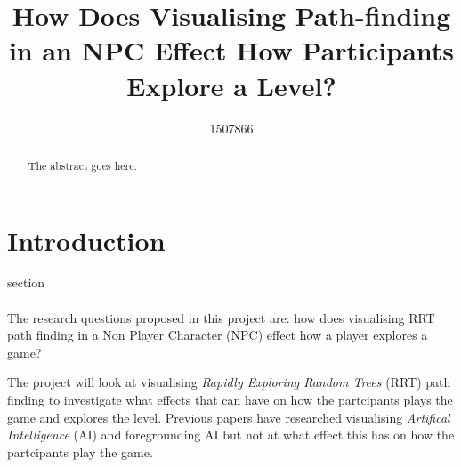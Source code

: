 \documentclass[journal]{IEEEtran}
\begin{document}
%
\title{ How Does Visualising Path-finding in an NPC Effect How Participants Explore a Level?}
%
%
\author{1507866}


\maketitle

\begin{abstract}
The abstract goes here.
\end{abstract}

\section{Introduction}
% 
% 
% 
% 
 section \\
\\
The research questions proposed in this project are: how does visualising RRT path finding in a Non Player Character (NPC) effect how a player explores a game?

The project will look at visualising \textit{Rapidly Exploring Random Trees} (RRT) path finding to investigate what effects that can have on how the partcipants plays the game and explores the level.  Previous papers have researched visualising \textit{Artifical Intelligence} (AI) and foregrounding AI but not at what effect this has on how the partcipants play the game.
\end{document}
